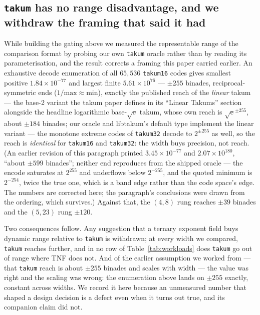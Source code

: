\subsection{\texttt{takum} has no range disadvantage, and we withdraw the framing that said it had}
\label{sec:takumrange}

While building the gating above we measured the representable range of the
comparison format by probing our own \texttt{takum} oracle rather than by reading
its parameterisation, and the result corrects a framing this paper carried
earlier. An exhaustive decode enumeration of all $65{,}536$ \texttt{takum16}
codes gives smallest positive $1.84 \times 10^{-77}$ and largest finite
$5.61 \times 10^{76}$ --- $\pm 255$ binades, reciprocal-symmetric ends
($1/\text{max} \approx \text{min}$), exactly the published reach of the
\emph{linear} takum --- the base-2 variant the takum paper defines in its
``Linear Takums'' section alongside the headline logarithmic
base-$\sqrt{\mathrm{e}}$ takum,
whose own reach is $\sqrt{\mathrm{e}}^{\pm 255}$, about $\pm 184$ binades;
our oracle and libtakum's default type implement the linear variant --- the
monotone extreme codes of \texttt{takum32} decode to $2^{\pm 255}$ as well, so
the reach is \emph{identical} for \texttt{takum16} and \texttt{takum32}: the
width buys precision, not reach. (An earlier revision of this paragraph printed
$3.45 \times 10^{-77}$ and $2.07 \times 10^{180}$, ``about $\pm 599$
binades''; neither end reproduces from the shipped oracle --- the encode
saturates at $2^{255}$ and underflows below $2^{-255}$, and the quoted minimum
is $2^{-254}$, twice the true one, which is a band edge rather than the code
space's edge. The numbers are corrected here; the paragraph's conclusions were
drawn from the ordering, which survives.) Against that, the $(4,8)$ rung
reaches $\pm 39$ binades and the $(5,23)$ rung $\pm 120$.

Two consequences follow. Any suggestion that a ternary exponent field buys
dynamic range relative to \texttt{takum} is withdrawn; at every width we compared,
\texttt{takum} reaches further, and in no row of Table~\ref{tab:workloads} does
\texttt{takum} go out of range where TNF does not. And of the earlier assumption we
worked from --- that \texttt{takum} reach is about $\pm 255$ binades and scales
with width --- the value was right and the scaling was wrong: the enumeration
above lands on $\pm 255$ exactly, constant across widths. We record it here
because an unmeasured number that shaped a design decision is a defect even
when it turns out true, and its companion claim did not.

